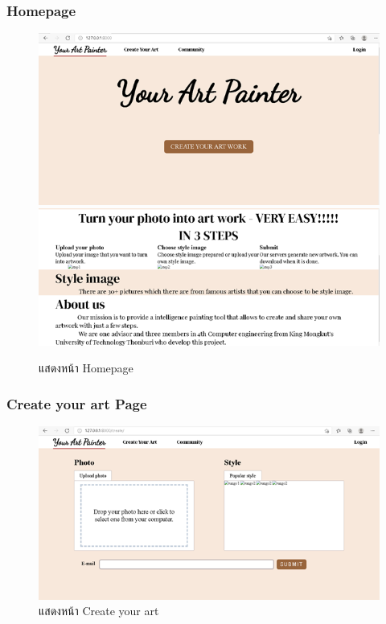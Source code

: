 \documentclass[12pt,oneside,openright,a4paper]{cpe-thai-project}
\begin{document}
\subsubsection{Homepage}
\begin{figure}[p]
  \centering
  \includegraphics[width=12cm]{./image/front1.png}
  \includegraphics[width=12cm]{./image/front2.png}
  \caption{แสดงหน้า Homepage}
  \label{fig:front1-2}
\end{figure}

\subsubsection{Create your art Page}
\begin{figure}[p]
  \centering
  \includegraphics[width=12cm]{./image/front3.png}
  \caption{แสดงหน้า Create your art }
  \label{fig:front3}
\end{figure}
\end{document}
